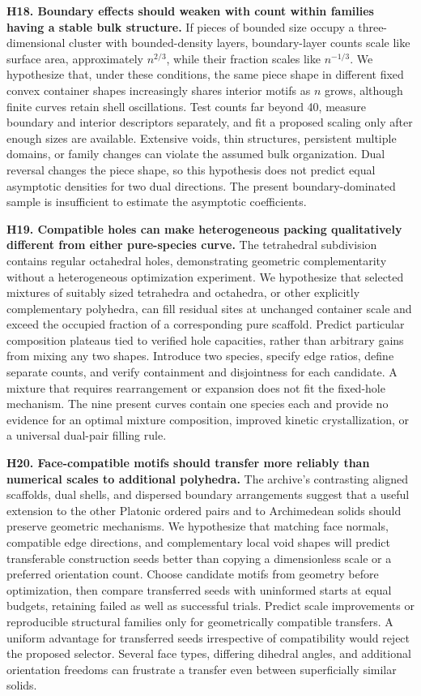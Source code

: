 \documentclass[11pt,a4paper]{article}
\begin{document}
\textbf{H18. Boundary effects should weaken with count within families having a stable bulk structure.} If pieces of bounded size occupy a three-dimensional cluster with bounded-density layers, boundary-layer counts scale like surface area, approximately $n^{2/3}$, while their fraction scales like $n^{-1/3}$. We hypothesize that, under these conditions, the same piece shape in different fixed convex container shapes increasingly shares interior motifs as $n$ grows, although finite curves retain shell oscillations. Test counts far beyond 40, measure boundary and interior descriptors separately, and fit a proposed scaling only after enough sizes are available. Extensive voids, thin structures, persistent multiple domains, or family changes can violate the assumed bulk organization. Dual reversal changes the piece shape, so this hypothesis does not predict equal asymptotic densities for two dual directions. The present boundary-dominated sample is insufficient to estimate the asymptotic coefficients.

\textbf{H19. Compatible holes can make heterogeneous packing qualitatively different from either pure-species curve.} The tetrahedral subdivision contains regular octahedral holes, demonstrating geometric complementarity without a heterogeneous optimization experiment. We hypothesize that selected mixtures of suitably sized tetrahedra and octahedra, or other explicitly complementary polyhedra, can fill residual sites at unchanged container scale and exceed the occupied fraction of a corresponding pure scaffold. Predict particular composition plateaus tied to verified hole capacities, rather than arbitrary gains from mixing any two shapes. Introduce two species, specify edge ratios, define separate counts, and verify containment and disjointness for each candidate. A mixture that requires rearrangement or expansion does not fit the fixed-hole mechanism. The nine present curves contain one species each and provide no evidence for an optimal mixture composition, improved kinetic crystallization, or a universal dual-pair filling rule.

\textbf{H20. Face-compatible motifs should transfer more reliably than numerical scales to additional polyhedra.} The archive's contrasting aligned scaffolds, dual shells, and dispersed boundary arrangements suggest that a useful extension to the other Platonic ordered pairs and to Archimedean solids should preserve geometric mechanisms. We hypothesize that matching face normals, compatible edge directions, and complementary local void shapes will predict transferable construction seeds better than copying a dimensionless scale or a preferred orientation count. Choose candidate motifs from geometry before optimization, then compare transferred seeds with uninformed starts at equal budgets, retaining failed as well as successful trials. Predict scale improvements or reproducible structural families only for geometrically compatible transfers. A uniform advantage for transferred seeds irrespective of compatibility would reject the proposed selector. Several face types, differing dihedral angles, and additional orientation freedoms can frustrate a transfer even between superficially similar solids.
\end{document}
